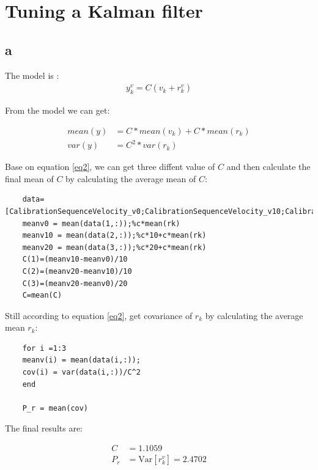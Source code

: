\section{Tuning a Kalman filter}

\subsection{a}

The model is :
\begin{equation}
    \begin{aligned}
        y_k^v=C(v_k+r_k^v)
    \end{aligned}
\end{equation}

From the model we can get:

\begin{equation}
    \begin{aligned}
        mean(y)&= C*mean(v_k)+C*mean(r_k)\\
        var(y) &= C^2*var(r_k) 
    \end{aligned}
    \label{eq2}
\end{equation}

Base on equation \ref{eq2}, we can get three diffent value of $ C $ and then calculate the final mean of $C$ by calculating the average mean of $C$:

\begin{lstlisting}
    data=[CalibrationSequenceVelocity_v0;CalibrationSequenceVelocity_v10;CalibrationSequenceVelocity_v20];
    meanv0 = mean(data(1,:));%c*mean(rk)
    meanv10 = mean(data(2,:));%c*10+c*mean(rk)
    meanv20 = mean(data(3,:));%c*20+c*mean(rk)
    C(1)=(meanv10-meanv0)/10
    C(2)=(meanv20-meanv10)/10
    C(3)=(meanv20-meanv0)/20
    C=mean(C)
\end{lstlisting}

Still according to equation \ref{eq2}, get covariance of $r_k$ by calculating the average mean $r_k$:

\begin{lstlisting}
    for i =1:3
    meanv(i) = mean(data(i,:));
    cov(i) = var(data(i,:))/C^2
    end

    P_r = mean(cov)
\end{lstlisting}

The final results are:

\begin{equation}
    \begin{aligned}
        C &= 1.1059\\
        P_r &=\text{Var}[r_k^v]= 2.4702
    \end{aligned}
\end{equation}

